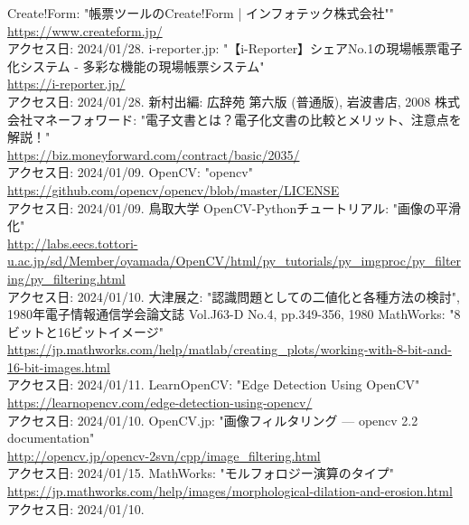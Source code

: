 \documentclass[uplatex, report, a4j, 10pt]{jsbook}
\begin{document}

%


%
\begin{thebibliography}{0}
  Create!Form: "帳票ツールのCreate!Form | インフォテック株式会社""\\\url{https://www.createform.jp/}\\アクセス日: 2024/01/28.
  i-reporter.jp: "【i-Reporter】シェアNo.1の現場帳票電子化システム - 多彩な機能の現場帳票システム"\\\url{https://i-reporter.jp/}\\アクセス日: 2024/01/28.
  新村出編: 広辞苑 第六版 (普通版), 岩波書店, 2008
  株式会社マネーフォワード: "電子文書とは？電子化文書の比較とメリット、注意点を解説！"\\\url{https://biz.moneyforward.com/contract/basic/2035/}\\アクセス日: 2024/01/09.
  OpenCV: "opencv"\\\url{https://github.com/opencv/opencv/blob/master/LICENSE}\\アクセス日: 2024/01/09.
  鳥取大学 OpenCV-Pythonチュートリアル: "画像の平滑化"\\\url{http://labs.eecs.tottori-u.ac.jp/sd/Member/oyamada/OpenCV/html/py_tutorials/py_imgproc/py_filtering/py_filtering.html}\\アクセス日: 2024/01/10.
  大津展之: "認識問題としての二値化と各種方法の検討", 1980年電子情報通信学会論文誌 Vol.J63-D No.4, pp.349-356, 1980
  MathWorks: "8ビットと16ビットイメージ"\\\url{https://jp.mathworks.com/help/matlab/creating_plots/working-with-8-bit-and-16-bit-images.html}\\アクセス日: 2024/01/11.
  LearnOpenCV: "Edge Detection Using OpenCV"\\\url{https://learnopencv.com/edge-detection-using-opencv/}\\アクセス日: 2024/01/10.
  OpenCV.jp: "画像フィルタリング — opencv 2.2 documentation"\\\url{http://opencv.jp/opencv-2svn/cpp/image_filtering.html}\\アクセス日: 2024/01/15.
  MathWorks: "モルフォロジー演算のタイプ"\\\url{https://jp.mathworks.com/help/images/morphological-dilation-and-erosion.html}\\アクセス日: 2024/01/10.

\end{thebibliography}
\end{document}
